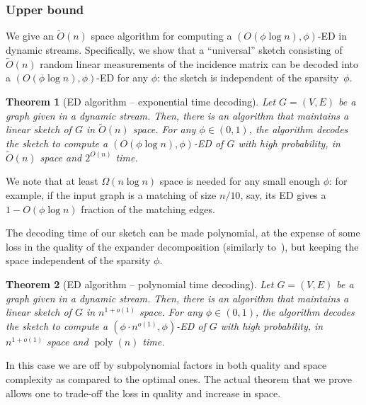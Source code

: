 \documentclass[epsfig,letter,11pt]{article}
\numberwithin{equation}{section}
\newcommand{\otil}{\tilde{O}}
\renewcommand{\tilde}{\widetilde}
\DeclareMathOperator*{\poly}{poly}
\newtheorem{mainthsimple}{Theorem}
\begin{document}
\subsubsection*{Upper bound}
We give an $\otil(n)$ space algorithm for computing a $(O(\phi \log n), \phi)$-ED in dynamic streams. Specifically, we show that a ``universal'' sketch consisting of $\otil(n)$ random linear measurements of the incidence matrix can be decoded into a $(O(\phi \log n), \phi)$-ED for any $\phi$: the sketch is independent of the sparsity~$\phi$.


\begin{mainthsimple}[ED algorithm -- exponential time decoding]
	\label{cor:main}
	Let $G=(V,E)$ be a graph given in a dynamic stream. Then, there is an algorithm that maintains a linear sketch of $G$ in $\otil(n)$ space. For any $\phi \in (0,1)$, the algorithm decodes the sketch to compute a $(O(\phi \log n), \phi)$-ED of $G$ with high probability, in $\otil(n)$ space and $2^{O(n)}$ time.
\end{mainthsimple}


\noindent
We note that at least $\Omega(n\log n)$ space is needed for any small enough $\phi$: for example, if the input graph is a matching of size $n/10$, say, its ED gives a $1-O(\phi \log n)$ fraction of the matching edges. 

The decoding time of our sketch can be made polynomial, at the expense of some loss in the quality of the expander decomposition (similarly to~\cite{streamexpdec}), but keeping the space independent of the sparsity $\phi$.

\begin{mainthsimple}[ED algorithm -- polynomial time decoding]
	\label{cor:mainpoly}
	Let $G=(V,E)$ be a graph given in a dynamic stream. Then, there is an algorithm that maintains a linear sketch of $G$ in $n^{1+o(1)}$ space. For any $\phi \in (0,1)$, the algorithm decodes the sketch to compute a $(\phi \cdot n^{o(1)}, \phi)$-ED of $G$ with high probability, in $n^{1+o(1)}$ space and $\poly(n)$ time.
\end{mainthsimple}

\noindent
In this case we are off by subpolynomial factors in both quality and space complexity as compared to the optimal ones. The actual theorem that we prove allows one to trade-off the loss in quality and increase in space.
\end{document}
